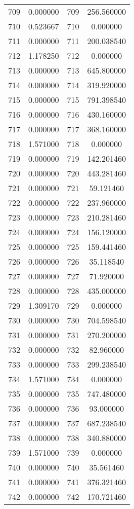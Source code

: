 \documentclass[12pt]{article}
\begin{document}
\begin{longtable}{@{}cccc@{}}
709 & 0.000000 & 709 & 256.560000 \\
710 & 0.523667 & 710 & 0.000000 \\
711 & 0.000000 & 711 & 200.038540 \\
712 & 1.178250 & 712 & 0.000000 \\
713 & 0.000000 & 713 & 645.800000 \\
714 & 0.000000 & 714 & 319.920000 \\
715 & 0.000000 & 715 & 791.398540 \\
716 & 0.000000 & 716 & 430.160000 \\
717 & 0.000000 & 717 & 368.160000 \\
718 & 1.571000 & 718 & 0.000000 \\
719 & 0.000000 & 719 & 142.201460 \\
720 & 0.000000 & 720 & 443.281460 \\
721 & 0.000000 & 721 & 59.121460 \\
722 & 0.000000 & 722 & 237.960000 \\
723 & 0.000000 & 723 & 210.281460 \\
724 & 0.000000 & 724 & 156.120000 \\
725 & 0.000000 & 725 & 159.441460 \\
726 & 0.000000 & 726 & 35.118540 \\
727 & 0.000000 & 727 & 71.920000 \\
728 & 0.000000 & 728 & 435.000000 \\
729 & 1.309170 & 729 & 0.000000 \\
730 & 0.000000 & 730 & 704.598540 \\
731 & 0.000000 & 731 & 270.200000 \\
732 & 0.000000 & 732 & 82.960000 \\
733 & 0.000000 & 733 & 299.238540 \\
734 & 1.571000 & 734 & 0.000000 \\
735 & 0.000000 & 735 & 747.480000 \\
736 & 0.000000 & 736 & 93.000000 \\
737 & 0.000000 & 737 & 687.238540 \\
738 & 0.000000 & 738 & 340.880000 \\
739 & 1.571000 & 739 & 0.000000 \\
740 & 0.000000 & 740 & 35.561460 \\
741 & 0.000000 & 741 & 376.321460 \\
742 & 0.000000 & 742 & 170.721460 \\

\end{longtable}
\end{document}
